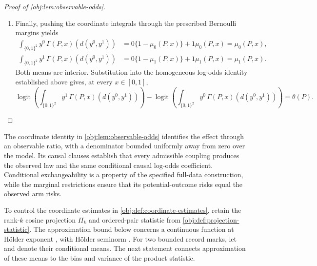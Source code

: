 \documentclass[11pt]{article}
\begin{document}
\begin{proof}[Proof of \cref{obj:lem:observable-odds}]
\begin{enumerate}
\item Finally, pushing the coordinate integrals through the prescribed Bernoulli margins yields
\[
\begin{aligned}
\int_{\{0,1\}^2}y^0\,\Gamma(P,x)(d(y^0,y^1))
&=0\{1-\mu_0(P,x)\}+1\mu_0(P,x)=\mu_0(P,x),\\
\int_{\{0,1\}^2}y^1\,\Gamma(P,x)(d(y^0,y^1))
&=0\{1-\mu_1(P,x)\}+1\mu_1(P,x)=\mu_1(P,x).
\end{aligned}
\]
Both means are interior. Substitution into the homogeneous log-odds identity established above gives, at every \(x\in[0,1]\),
\[
\operatorname{logit}
 \left(\int_{\{0,1\}^2}y^1\,\Gamma(P,x)(d(y^0,y^1))\right)
-
\operatorname{logit}
 \left(\int_{\{0,1\}^2}y^0\,\Gamma(P,x)(d(y^0,y^1))\right)
=\theta(P).
\]
\end{enumerate}
\end{proof}

The coordinate identity in \cref{obj:lem:observable-odds} identifies the effect through an observable ratio, with a denominator bounded uniformly away from zero over the model. Its causal clauses establish that every admissible coupling produces the observed law and the same conditional causal log-odds coefficient. Conditional exchangeability is a property of the specified full-data construction, while the marginal restrictions ensure that its potential-outcome risks equal the observed arm risks.

To control the coordinate estimates in \cref{obj:def:coordinate-estimates}, retain the rank-\(k\) cosine projection \(\Pi_k\) and ordered-pair statistic from \cref{obj:def:projection-statistic}. The approximation bound below concerns a continuous function  at Hölder exponent , with Hölder seminorm . For two bounded record marks, let  and  denote their conditional means. The next statement connects approximation of these means to the bias and variance of the product statistic.
\end{document}
